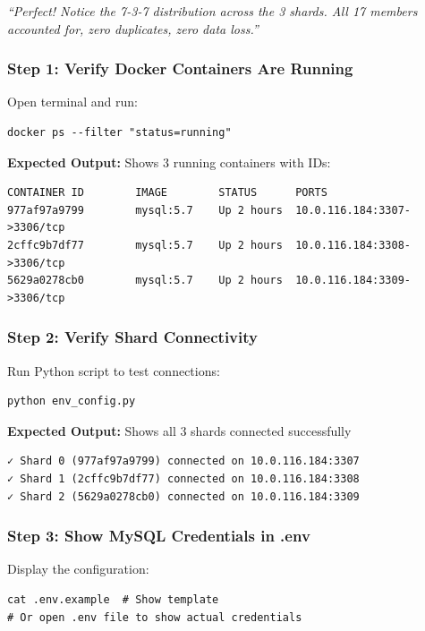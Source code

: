 \documentclass[12pt]{article}
\begin{document}
\textit{``Perfect! Notice the 7-3-7 distribution across the 3 shards. All 17 members accounted for, zero duplicates, zero data loss.''}

\subsubsection*{Step 1: Verify Docker Containers Are Running}

Open terminal and run:

\begin{lstlisting}
docker ps --filter "status=running"
\end{lstlisting}

\textbf{Expected Output:} Shows 3 running containers with IDs:
\begin{lstlisting}
CONTAINER ID        IMAGE        STATUS      PORTS
977af97a9799        mysql:5.7    Up 2 hours  10.0.116.184:3307->3306/tcp
2cffc9b7df77        mysql:5.7    Up 2 hours  10.0.116.184:3308->3306/tcp
5629a0278cb0        mysql:5.7    Up 2 hours  10.0.116.184:3309->3306/tcp
\end{lstlisting}

\subsubsection*{Step 2: Verify Shard Connectivity}

Run Python script to test connections:

\begin{lstlisting}
python env_config.py
\end{lstlisting}

\textbf{Expected Output:} Shows all 3 shards connected successfully
\begin{lstlisting}
✓ Shard 0 (977af97a9799) connected on 10.0.116.184:3307
✓ Shard 1 (2cffc9b7df77) connected on 10.0.116.184:3308
✓ Shard 2 (5629a0278cb0) connected on 10.0.116.184:3309
\end{lstlisting}

\subsubsection*{Step 3: Show MySQL Credentials in .env}

Display the configuration:

\begin{lstlisting}
cat .env.example  # Show template
# Or open .env file to show actual credentials
\end{lstlisting}
\end{document}
